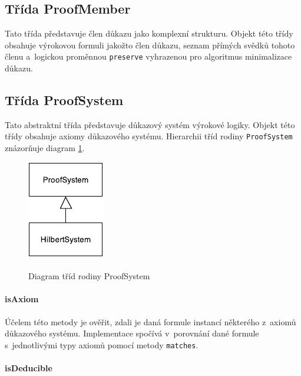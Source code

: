 \documentclass[thesis=B,czech,hidelinks]{thesis}[2012/06/26]
\begin{document}
\subsection{Třída ProofMember}

Tato třída představuje člen důkazu jako komplexní strukturu. Objekt této třídy obsahuje výrokovou formuli jakožto člen důkazu, seznam přímých svědků tohoto členu a~logickou proměnnou \texttt{preserve} vyhrazenou pro algoritmus minimalizace důkazu.

\subsection{Třída ProofSystem}

Tato abstraktní třída představuje důkazový systém výrokové logiky. Objekt této třídy obsahuje axiomy důkazového systému. Hierarchii tříd rodiny \texttt{ProofSystem} znázorňuje diagram \ref{fig:proof_system}.

\begin{figure}
\centering
\caption{Diagram tříd rodiny ProofSystem}
\includegraphics{diagrams/proof_system}
\label{fig:proof_system}
\end{figure}

\paragraph{isAxiom}

Účelem této metody je ověřit, zdali je daná formule instancí některého z~axiomů důkazového systému. Implementace spočívá v~porovnání dané formule s~jednotlivými typy axiomů pomocí metody \texttt{matches}.

\begin{algorithm}
{
	{
		\;
	}
}
\end{algorithm}

\paragraph{isDeducible}
\end{document}
